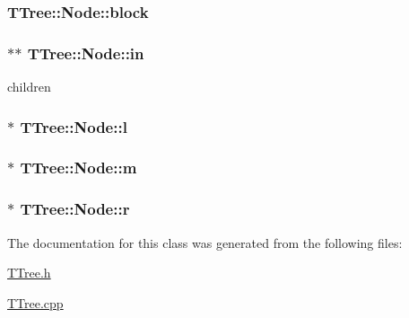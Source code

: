 \subsubsection[{block}]{ T\+Tree\+::\+Node\+::block}\label{classTTree_1_1Node_a100664635a89fa354373102768bd22be}
\hypertarget{classTTree_1_1Node_ab126c67191b7e91a1eccc18a3eeadf0b}{}
\subsubsection[{in}]{$\ast$$\ast$ T\+Tree\+::\+Node\+::in}\label{classTTree_1_1Node_ab126c67191b7e91a1eccc18a3eeadf0b}


children 

\hypertarget{classTTree_1_1Node_a78f1bf067928d0e0106e1187364cc69e}{}
\subsubsection[{l}]{$\ast$ T\+Tree\+::\+Node\+::l}\label{classTTree_1_1Node_a78f1bf067928d0e0106e1187364cc69e}
\hypertarget{classTTree_1_1Node_a3f47f1068b4631b1d9eddea0300c6bee}{}
\subsubsection[{m}]{ $\ast$ T\+Tree\+::\+Node\+::m}\label{classTTree_1_1Node_a3f47f1068b4631b1d9eddea0300c6bee}
\hypertarget{classTTree_1_1Node_adb67ed846e6787b3ff26bbcee11ee4b6}{}
\subsubsection[{r}]{ $\ast$ T\+Tree\+::\+Node\+::r}\label{classTTree_1_1Node_adb67ed846e6787b3ff26bbcee11ee4b6}


The documentation for this class was generated from the following files\+:\begin{DoxyCompactItemize}
\item 
\hyperlink{TTree_8h}{T\+Tree.\+h}\item 
\hyperlink{TTree_8cpp}{T\+Tree.\+cpp}\end{DoxyCompactItemize}
